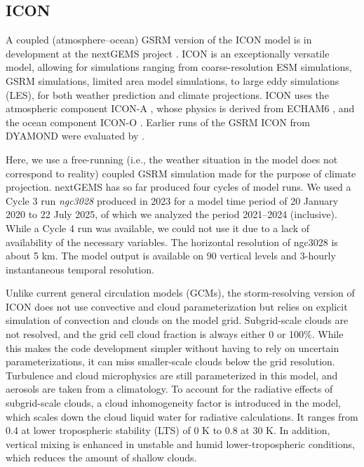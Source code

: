 \documentclass[draft]{agujournal2019}
\begin{document}
\subsection{ICON}
\label{sec:icon}

A coupled (atmosphere--ocean) GSRM version of the ICON model is in development at the nextGEMS project \cite{hohenegger2023}. ICON is an exceptionally versatile model, allowing for simulations ranging from coarse-resolution ESM simulations, GSRM simulations, limited area model simulations, to large eddy simulations (LES), for both weather prediction and climate projections. ICON uses the atmospheric component ICON-A \cite{giorgetta2018}, whose physics is derived from ECHAM6 \cite{stevens2013}, and the ocean component ICON-O \cite{korn2022}. Earlier runs of the GSRM ICON from DYAMOND were evaluated by .

Here, we use a free-running (i.e., the weather situation in the model does not correspond to reality) coupled GSRM simulation made for the purpose of climate projection. nextGEMS has so far produced four cycles of model runs. We used a Cycle 3 run \emph{ngc3028} produced in 2023 \cite{nextgems2023a,nextgems2023b} for a model time period of 20 January 2020 to 22 July 2025, of which we analyzed the period 2021--2024 (inclusive). While a Cycle 4 run was available, we could not use it due to a lack of availability of the necessary variables. The horizontal resolution of ngc3028 is about 5 km. The model output is available on 90 vertical levels and 3-hourly instantaneous temporal resolution.

Unlike current general circulation models (GCMs), the storm-resolving version of ICON does not use convective and cloud parameterization but relies on explicit simulation of convection and clouds on the model grid. Subgrid-scale clouds are not resolved, and the grid cell cloud fraction is always either 0 or 100\%. While this makes the code development simpler without having to rely on uncertain parameterizations, it can miss smaller-scale clouds below the grid resolution. Turbulence and cloud microphysics are still parameterized in this model, and aerosols are taken from a climatology. To account for the radiative effects of subgrid-scale clouds, a cloud inhomogeneity factor is introduced in the model, which scales down the cloud liquid water for radiative calculations. It ranges from 0.4 at lower tropospheric stability (LTS) of 0 K to 0.8 at 30 K. In addition, vertical mixing is enhanced in unstable and humid lower-tropospheric conditions, which reduces the amount of shallow clouds.
\end{document}
